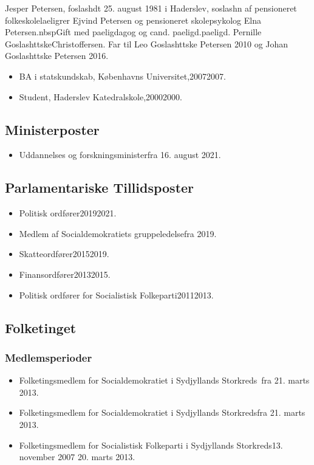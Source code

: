 \documentclass[11pt, a4paper]{awesome-cv}
\begin{document}
\makecvheader[R]
\makelettertitle
\begin{cvletter}
Jesper Petersen, foslashdt 25. august 1981 i Haderslev, soslashn af pensioneret folkeskolelaeligrer Ejvind Petersen og pensioneret skolepsykolog Elna Petersen.nbspGift med paeligdagog og cand. paeligd.paeligd. Pernille GoslashttskeChristoffersen. Far til Leo Goslashttske Petersen 2010 og Johan Goslashttske Petersen 2016.

\begin{itemize}
\item BA i statskundskab, Københavns Universitet,20072007.
\item Student, Haderslev Katedralskole,20002000.
\end{itemize}
\subsection*{Ministerposter}
\begin{itemize}
\item Uddannelses og forskningsministerfra 16. august 2021.
\end{itemize}
\subsection*{Parlamentariske Tillidsposter}
\begin{itemize}
\item Politisk ordfører20192021.
\item Medlem af Socialdemokratiets gruppeledelsefra 2019.
\item Skatteordfører20152019.
\item Finansordfører20132015.
\item Politisk ordfører for Socialistisk Folkeparti20112013.
\end{itemize}
\subsection*{Folketinget}
\subsubsection*{Medlemsperioder}
\begin{itemize}
\item Folketingsmedlem for Socialdemokratiet i Sydjyllands Storkreds fra 21. marts 2013.
\item Folketingsmedlem for Socialdemokratiet i Sydjyllands Storkredsfra 21. marts 2013.
\item Folketingsmedlem for Socialistisk Folkeparti i Sydjyllands Storkreds13. november 2007  20. marts 2013.
\end{itemize}

\end{cvletter}
\end{document}
